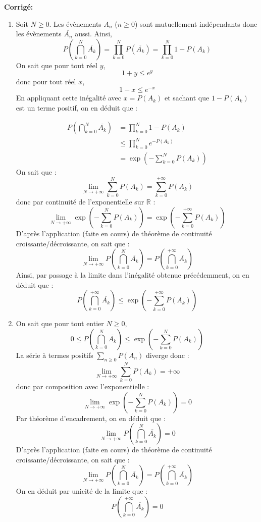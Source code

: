 \documentclass[a4paper,twoside,french,10pt]{VcCours}
\newcommand{\corr}{\textbf{Corrigé:}}
\begin{document}
\corr 
\begin{enumerate}
\item Soit $N \geq 0$. Les évènements $A_n$ ($n \geq 0$) sont mutuellement indépendants donc les évènements $\overline{A_n}$ aussi. Ainsi,
$$  P \left( \bigcap_{k=0}^N \overline{A_k} \right) = \prod_{k=0}^N P( \overline{A_k}) =  \prod_{k=0}^N 1- P(A_k) $$
On sait que pour tout réel $y$,
$$ 1+y \leq e^y$$
donc pour tout réel $x$,
$$ 1-x \leq e^{-x}$$
En appliquant cette inégalité avec $x=P(A_k)$ et sachant que $1-P(A_k)$ est un terme positif, on en déduit que :

\begin{align*}
P \left( \bigcap_{k=0}^N \overline{A_k} \right) & = \prod_{k=0}^N 1- P(A_k) \\
& \leq \prod_{k=0}^N e^{-P(A_k)} \\
& = \exp \left(- \sum_{k=0}^N P(A_k) \right)
\end{align*}
On sait que :
$$ \lim_{N \rightarrow + \infty} \sum_{k=0}^N P(A_k) = \sum_{k=0}^{+ \infty} P(A_k)$$
donc par continuité de l'exponentielle sur $\mathbb{R}$ :
$$ \lim_{N \rightarrow + \infty}\exp \left(- \sum_{k=0}^N P(A_k) \right) = \exp \left(- \sum_{k=0}^{+ \infty} P(A_k) \right)$$
D'après l'application (faite en cours) de théorème de continuité croissante/décroissante, on sait que :
$$ \lim_{N \rightarrow + \infty} P \left( \bigcap_{k=0}^N \overline{A_k} \right) = P \left( \bigcap_{k=0}^{+ \infty} \overline{A_k} \right)$$
Ainsi, par passage à la limite dans l'inégalité obtenue précédemment, on en déduit que :
$$ P \left( \bigcap_{k=0}^{+ \infty} \overline{A_k} \right) \leq \exp \left(- \sum_{k=0}^{+ \infty} P(A_k) \right)$$
\item On sait que pour tout entier $N \geq 0$,
$$ 0 \leq P \left( \bigcap_{k=0}^N \overline{A_k} \right) \leq \exp \left(- \sum_{k=0}^N P(A_k) \right)$$ 
La série à termes positifs $\sum_{n \geq 0} P(A_n)$ diverge donc :
$$ \lim_{N \rightarrow + \infty} \sum_{k=0}^N P(A_k) = + \infty$$
donc par composition avec l'exponentielle :
$$ \lim_{N \rightarrow + \infty}\exp \left(- \sum_{k=0}^N P(A_k) \right) =0$$
Par théorème d'encadrement, on en déduit que :
$$ \lim_{N \rightarrow + \infty} P \left( \bigcap_{k=0}^N \overline{A_k} \right) = 0$$
D'après l'application (faite en cours) de théorème de continuité croissante/décroissante, on sait que :
$$ \lim_{N \rightarrow + \infty} P \left( \bigcap_{k=0}^N \overline{A_k} \right) = P \left( \bigcap_{k=0}^{+ \infty} \overline{A_k} \right)$$
On en déduit par unicité de la limite que :
$$ P \left( \bigcap_{k=0}^{+ \infty} \overline{A_k} \right) = 0$$
\end{enumerate}
\end{document}
